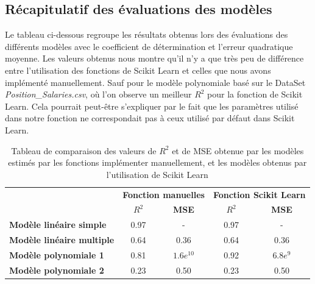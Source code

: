 \documentclass[french]{article}
\begin{document}
\newpage

\subsection{Récapitulatif des évaluations des modèles}

Le tableau ci-dessous regroupe les résultats obtenus lors des évaluations des différents modèles avec le coefficient de détermination et l'erreur quadratique moyenne. Les valeurs obtenus nous montre qu'il n'y a que très peu de différence entre l'utilisation des fonctions de Scikit Learn et celles que nous avons implémenté manuellement. Sauf pour le modèle polynomiale basé sur le DataSet \textit{Position\_Salaries.csv}, où l'on observe un meilleur $R^{2}$ pour la fonction de Scikit Learn. Cela pourrait peut-être s'expliquer par le fait que les paramètres utilisé dans notre fonction ne correspondait pas à ceux utilisé par défaut dans Scikit Learn.\\

\begin{table}[!htbp]
\begin{tabular}{l|cc|cc|}
\cline{2-5}
                                                        & \multicolumn{2}{l|}{\textbf{Fonction manuelles}}     & \multicolumn{2}{l|}{\textbf{Fonction Scikit Learn}}  \\ \cline{2-5} 
                                                        & \multicolumn{1}{c|}{\textbf{$R^{2}$}} & \textbf{MSE} & \multicolumn{1}{c|}{\textbf{$R^{2}$}} & \textbf{MSE} \\ \hline
\multicolumn{1}{|l|}{\textbf{Modèle linéaire simple}}   & \multicolumn{1}{c|}{0.97}             & -            & \multicolumn{1}{c|}{0.97}             & -            \\ \hline
\multicolumn{1}{|l|}{\textbf{Modèle linéaire multiple}} & \multicolumn{1}{c|}{0.64}             & 0.36         & \multicolumn{1}{c|}{0.64}             & 0.36         \\ \hline
\multicolumn{1}{|l|}{\textbf{Modèle polynomiale 1}}     & \multicolumn{1}{c|}{0.81}             & $1.6e^{10}$  & \multicolumn{1}{c|}{0.92}             & $6.8e^{9}$   \\ \hline
\multicolumn{1}{|l|}{\textbf{Modèle polynomiale 2}}     & \multicolumn{1}{c|}{0.23}             & 0.50         & \multicolumn{1}{c|}{0.23}             & 0.50         \\ \hline
\end{tabular}
\caption{Tableau de comparaison des valeurs de $R^{2}$ et de MSE obtenue par les modèles estimés par les fonctions implémenter manuellement, et les modèles obtenus par l'utilisation de Scikit Learn}
\label{tab:comparatif}
\end{table}
\end{document}
